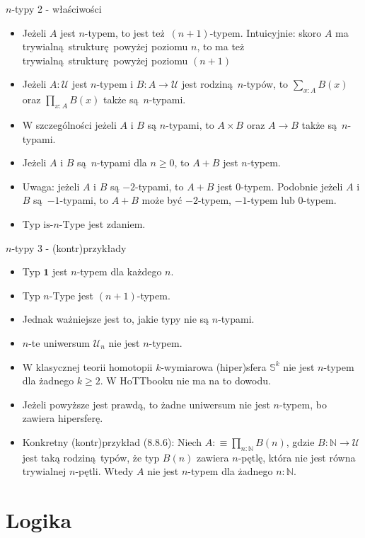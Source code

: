 \documentclass{beamer}
\newcommand{\defn}{:\equiv}
\newcommand{\U}{\mathcal{U}}
\begin{document}
\begin{frame}{$n$-typy 2 - właściwości}
\begin{itemize}
	\item Jeżeli $A$ jest $n$-typem, to jest też $(n + 1)$-typem. Intuicyjnie: skoro $A$ ma trywialną strukturę powyżej poziomu $n$, to ma też trywialną strukturę powyżej poziomu $(n + 1)$
	\item Jeżeli $A : \U$ jest $n$-typem i $B : A \to \U$ jest rodziną $n$-typów, to $\sum_{x : A} B(x)$ oraz $\prod_{x : A} B(x)$ także są $n$-typami.
	\item W szczególności jeżeli $A$ i $B$ są $n$-typami, to $A \times B$ oraz $A \to B$ także są $n$-typami.
	\item Jeżeli $A$ i $B$ są $n$-typami dla $n \geq 0$, to $A + B$ jest $n$-typem.
	\item Uwaga: jeżeli $A$ i $B$ są $-2$-typami, to $A + B$ jest $0$-typem. Podobnie jeżeli $A$ i $B$ są $-1$-typami, to $A + B$ może być $-2$-typem, $-1$-typem lub $0$-typem.
	\item Typ $\text{is-}n\text{-Type}$ jest zdaniem.
\end{itemize}
\end{frame}

\begin{frame}{$n$-typy 3 - (kontr)przykłady}
\begin{itemize}
	\item Typ $\mathbf{1}$ jest $n$-typem dla każdego $n$.
	\item Typ $n\text{-Type}$ jest $(n + 1)$-typem.
	\item Jednak ważniejsze jest to, jakie typy nie są $n$-typami.
	\item $n$-te uniwersum $\U_n$ nie jest $n$-typem.
	\item W klasycznej teorii homotopii $k$-wymiarowa (hiper)sfera $\mathbb{S}^k$ nie jest $n$-typem dla żadnego $k \geq 2$. W HoTTbooku nie ma na to dowodu.
	\item Jeżeli powyższe jest prawdą, to żadne uniwersum nie jest $n$-typem, bo zawiera hipersferę.
	\item Konkretny (kontr)przykład (8.8.6): Niech $A \defn \prod_{n : \mathbb{N}} B(n)$, gdzie $B : \mathbb{N} \to \U$ jest taką rodziną typów, że typ $B(n)$ zawiera $n$-pętlę, która nie jest równa trywialnej $n$-pętli. Wtedy $A$ nie jest $n$-typem dla żadnego $n : \mathbb{N}$.
\end{itemize}
\end{frame}

\section{Logika}
\end{document}
